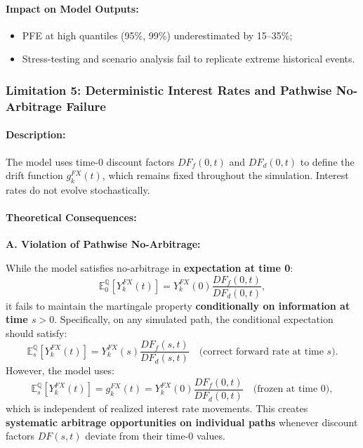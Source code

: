 \paragraph{Impact on Model Outputs:}
\begin{itemize}
	\item PFE at high quantiles (95\%, 99\%) underestimated by 15--35\%;
	\item Stress-testing and scenario analysis fail to replicate extreme historical events.
\end{itemize}

\subsubsection{Limitation 5: Deterministic Interest Rates and Pathwise No-Arbitrage Failure}

\paragraph{Description:}
The model uses time-0 discount factors $DF_f(0,t)$ and $DF_d(0,t)$ to define the drift function $g_k^{FX}(t)$, which remains fixed throughout the simulation. Interest rates do not evolve stochastically.

\paragraph{Theoretical Consequences:}

\textbf{A. Violation of Pathwise No-Arbitrage:}

While the model satisfies no-arbitrage in \textbf{expectation at time 0}:
\begin{equation}
	\mathbb{E}^{\mathbb{Q}}_0\left[Y_k^{FX}(t)\right] = Y_k^{FX}(0)\frac{DF_f(0,t)}{DF_d(0,t)},
\end{equation}
it fails to maintain the martingale property \textbf{conditionally on information at time $s > 0$}. Specifically, on any simulated path, the conditional expectation should satisfy:
\begin{equation}
	\mathbb{E}^{\mathbb{Q}}_s\left[Y_k^{FX}(t)\right] = Y_k^{FX}(s)\frac{DF_f(s,t)}{DF_d(s,t)} \quad \text{(correct forward rate at time } s).
\end{equation}
However, the model uses:
\begin{equation}
	\mathbb{E}^{\mathbb{Q}}_s\left[Y_k^{FX}(t)\right] = g_k^{FX}(t) = Y_k^{FX}(0)\frac{DF_f(0,t)}{DF_d(0,t)} \quad \text{(frozen at time 0)},
\end{equation}
which is independent of realized interest rate movements. This creates \textbf{systematic arbitrage opportunities on individual paths} whenever discount factors $DF(s,t)$ deviate from their time-0 values.

